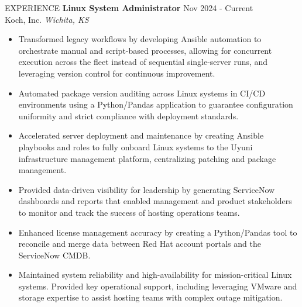 \documentclass{faang} %
\begin{document}
\begin{rSection}{EXPERIENCE}
\textbf{Linux System Administrator} \hfill {Nov 2024 - Current}\\
Koch, Inc. \hfill \textit{Wichita, KS}
 \begin{itemize}
  \itemsep -3pt {} 
    \item Transformed legacy workflows by developing Ansible automation to orchestrate manual and script-based processes, allowing for concurrent execution across the fleet instead of sequential single-server runs, and leveraging version control for continuous improvement.
    \item Automated package version auditing across Linux systems in CI/CD environments using a Python/Pandas application to guarantee configuration uniformity and strict compliance with deployment standards.
    \item Accelerated server deployment and maintenance by creating Ansible playbooks and roles to fully onboard Linux systems to the Uyuni infrastructure management platform, centralizing patching and package management.
    \item Provided data-driven visibility for leadership by generating ServiceNow dashboards and reports that enabled management and product stakeholders to monitor and track the success of hosting operations teams.
    \item Enhanced license management accuracy by creating a Python/Pandas tool to reconcile and merge data between Red Hat account portals and the ServiceNow CMDB.
    \item Maintained system reliability and high-availability for mission-critical Linux systems. Provided key operational support, including leveraging VMware and storage expertise to assist hosting teams with complex outage mitigation.
 \end{itemize}
 

\end{rSection}
\end{document}
